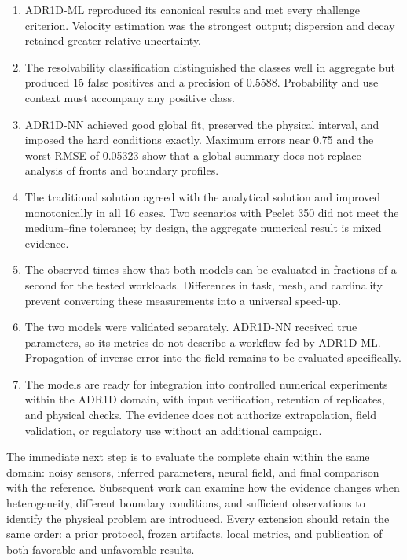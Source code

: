 \documentclass[11pt,a4paper]{article}
\begin{document}
\begin{enumerate}
    \item ADR1D-ML reproduced its canonical results and met every challenge
    criterion. Velocity estimation was the strongest output; dispersion and
    decay retained greater relative uncertainty.
    \item The resolvability classification distinguished the classes well in
    aggregate but produced 15 false positives and a precision of 0.5588.
    Probability and use context must accompany any positive class.
    \item ADR1D-NN achieved good global fit, preserved the physical interval,
    and imposed the hard conditions exactly. Maximum errors near 0.75 and the
    worst RMSE of 0.05323 show that a global summary does not replace analysis
    of fronts and boundary profiles.
    \item The traditional solution agreed with the analytical solution and
    improved monotonically in all 16 cases. Two scenarios with Peclet 350 did
    not meet the medium--fine tolerance; by design, the aggregate numerical
    result is mixed evidence.
    \item The observed times show that both models can be evaluated in
    fractions of a second for the tested workloads. Differences in task, mesh,
    and cardinality prevent converting these measurements into a universal
    speed-up.
    \item The two models were validated separately. ADR1D-NN received true
    parameters, so its metrics do not describe a workflow fed by ADR1D-ML.
    Propagation of inverse error into the field remains to be evaluated
    specifically.
    \item The models are ready for integration into controlled numerical
    experiments within the ADR1D domain, with input verification, retention of
    replicates, and physical checks. The evidence does not authorize
    extrapolation, field validation, or regulatory use without an additional
    campaign.
\end{enumerate}

The immediate next step is to evaluate the complete chain within the same
domain: noisy sensors, inferred parameters, neural field, and final comparison
with the reference. Subsequent work can examine how the evidence changes when
heterogeneity, different boundary conditions, and sufficient observations to
identify the physical problem are introduced. Every extension should retain
the same order: a prior protocol, frozen artifacts, local metrics, and
publication of both favorable and unfavorable results.
\end{document}
